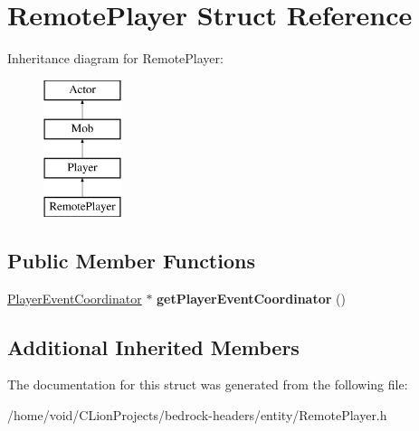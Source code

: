 \hypertarget{struct_remote_player}{}\section{Remote\+Player Struct Reference}
\label{struct_remote_player}
Inheritance diagram for Remote\+Player\+:\begin{figure}[H]
\begin{center}
\leavevmode
\includegraphics[height=4.000000cm]{struct_remote_player}
\end{center}
\end{figure}
\subsection*{Public Member Functions}
\begin{DoxyCompactItemize}
\item 
\mbox{\label{struct_remote_player_aeeac2740348421ee996321fb295d0db3}} 
\mbox{\hyperlink{struct_player_event_coordinator}{Player\+Event\+Coordinator}} $\ast$ {\bfseries get\+Player\+Event\+Coordinator} ()
\end{DoxyCompactItemize}
\subsection*{Additional Inherited Members}


The documentation for this struct was generated from the following file\+:\begin{DoxyCompactItemize}
\item 
/home/void/\+C\+Lion\+Projects/bedrock-\/headers/entity/Remote\+Player.\+h\end{DoxyCompactItemize}
